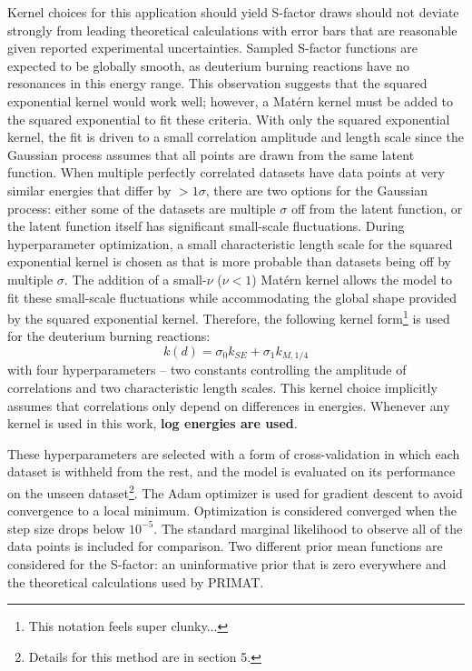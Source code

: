 \documentclass[%
 reprint,
superscriptaddress,
nofootinbib,
 amsmath,amssymb,
 aps,
 pra,
]{revtex4-2}
\begin{document}
Kernel choices for this application should yield S-factor draws should not deviate strongly from leading theoretical calculations with error bars that are reasonable given reported experimental uncertainties. Sampled S-factor functions are expected to be globally smooth, as deuterium burning reactions have no resonances in this energy range. This observation suggests that the squared exponential kernel would work well; however, a Mat\'ern kernel must be added to the squared exponential to fit these criteria. With only the squared exponential kernel, the fit is driven to a small correlation amplitude and length scale since the Gaussian process assumes that all points are drawn from the same latent function. When multiple perfectly correlated datasets have data points at very similar energies that differ by $>1\sigma$, there are two options for the Gaussian process: either some of the datasets are multiple $\sigma$ off from the latent function, or the latent function itself has significant small-scale fluctuations. During hyperparameter optimization, a small characteristic length scale for the squared exponential kernel is chosen as that is more probable than datasets being off by multiple $\sigma$. The addition of a small-$\nu$ ($\nu<1$) Mat\'ern kernel allows the model to fit these small-scale fluctuations while accommodating the global shape provided by the squared exponential kernel. Therefore, the following kernel form\footnote{This notation feels super clunky...} is used for the deuterium burning reactions: 
\begin{equation}
	k(d) = \sigma_0 k_{SE} + \sigma_1 k_{M, 1/4} \nonumber
\end{equation}
with four hyperparameters -- two constants controlling the amplitude of correlations and two characteristic length scales. This kernel choice implicitly assumes that correlations only depend on differences in energies. Whenever any kernel is used in this work, \textbf{log energies are used}. 

These hyperparameters are selected with a form of cross-validation in which each dataset is withheld from the rest, and the model is evaluated on its performance on the unseen dataset\footnote{Details for this method are in section 5.}. The Adam optimizer is used for gradient descent to avoid convergence to a local minimum. Optimization is considered converged when the step size drops below $10^{-5}$. The standard marginal likelihood to observe all of the data points is included for comparison. Two different prior mean functions are considered for the S-factor: an uninformative prior that is zero everywhere and the theoretical calculations used by PRIMAT. 
\end{document}
